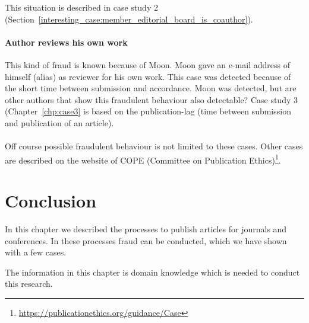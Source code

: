 \documentclass{ou-report}
\newcommand{\outline}[1]{{\color{blue} #1}}
\begin{document}
This situation is described in case study 2
(Section~\ref{interesting_case:member_editorial_board_is_coauthor}).

\paragraph{Author reviews his own work}
This kind of fraud is known because of Moon. Moon gave an e-mail address of 
himself (alias) as reviewer for his own work. This case was detected because of
the short time between submission and accordance. Moon was detected, but are 
other authors that show this fraudulent behaviour also detectable?
Case study 3 (Chapter~\ref{chp:case3} is based on the publication-lag (time 
between submission and publication of an article).

\paragraph{}
Off course possible fraudulent behaviour is not limited to these cases. Other 
cases are
described on the website of COPE (Committee on Publication Ethics)\footnote{\url{https://publicationethics.org/guidance/Case}}.

\section{Conclusion}
In this chapter we described the processes to publish 
articles for journals and conferences. In these processes fraud can be conducted,
which we have shown with a few cases.

The information in this chapter is domain knowledge which is needed to conduct 
this research.




\end{document}
